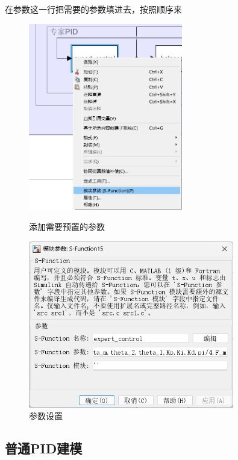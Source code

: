 \documentclass[12pt,a4paper,UTF8]{article}
\begin{document}
在参数这一行把需要的参数填进去，按照顺序来
\begin{figure}[!htbp]
\centering
\begin{minipage}[b]{0.45\linewidth}
    \centering
     \includegraphics[width=0.6\textwidth]{20241203114952.png}
\caption{添加需要预置的参数}
     
\end{minipage}%
\begin{minipage}[b]{0.45\linewidth}
    \centering
   \includegraphics[width=0.8\textwidth]{20241203115502.png}
\caption{参数设置}
\end{minipage}
\end{figure}




\clearpage
\subsection{普通PID建模}
\end{document}
